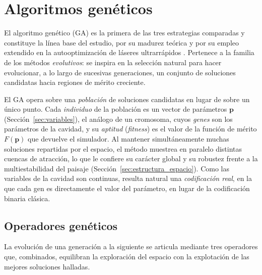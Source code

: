 \section{Algoritmos genéticos}
\label{sec:ga}

El algoritmo genético (GA) es la primera de las tres estrategias comparadas y
constituye la línea base del estudio, por su madurez teórica y por su empleo
extendido en la autooptimización de láseres ultrarrápidos
\cite{Andral2015,Woodward2016}. Pertenece a la familia de los métodos
\emph{evolutivos}: se inspira en la selección natural para hacer evolucionar, a lo
largo de sucesivas generaciones, un conjunto de soluciones candidatas hacia
regiones de mérito creciente.

\label{sec:ga_metafora}

El GA opera sobre una \emph{población} de soluciones candidatas en lugar de sobre un
único punto. Cada \emph{individuo} de la población es un vector de parámetros
$\mathbf{p}$ (Sección~\ref{sec:variables}), el análogo de un cromosoma, cuyos
\emph{genes} son los parámetros de la cavidad, y su \emph{aptitud} (\emph{fitness})
es el valor de la función de mérito $F(\mathbf{p})$ que devuelve el simulador. Al
mantener simultáneamente muchas soluciones repartidas por el espacio, el método
muestrea en paralelo distintas cuencas de atracción, lo que le confiere su carácter
global y su robustez frente a la multiestabilidad del paisaje
(Sección~\ref{sec:estructura_espacio}). Como las variables de la cavidad son
continuas, resulta natural una \emph{codificación real}, en la que cada gen es
directamente el valor del parámetro, en lugar de la codificación binaria clásica.

\subsection{Operadores genéticos}
\label{sec:ga_operadores}

La evolución de una generación a la siguiente se articula mediante tres operadores
que, combinados, equilibran la exploración del espacio con la explotación de las
mejores soluciones halladas.

